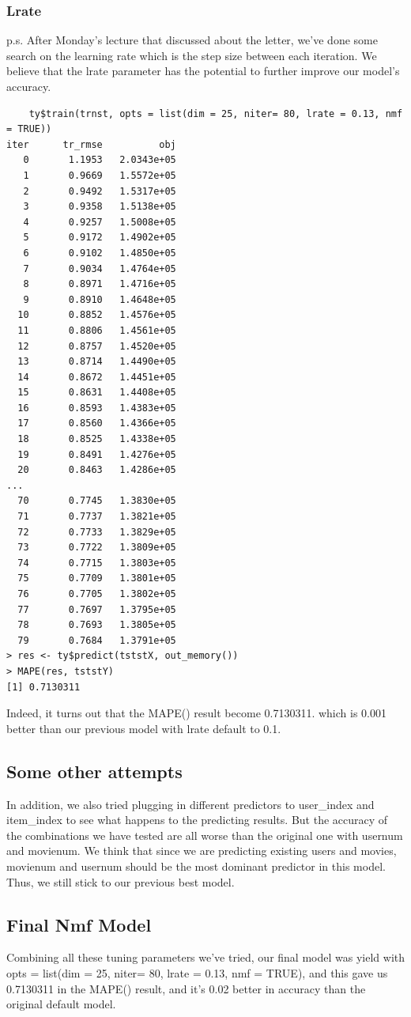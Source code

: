\documentclass[11pt]{article}
\newcommand\tab[1][0.5cm]{\hspace*{#1}}
\begin{document}
\subsubsection{Lrate}
\tab{}p.s. After Monday's lecture that discussed about the letter, we've done some search on the learning rate which is the step size between each iteration. We believe that the lrate parameter has the potential to further improve our model's accuracy.
\begin{verbatim}
    ty$train(trnst, opts = list(dim = 25, niter= 80, lrate = 0.13, nmf = TRUE))
iter      tr_rmse          obj
   0       1.1953   2.0343e+05
   1       0.9669   1.5572e+05
   2       0.9492   1.5317e+05
   3       0.9358   1.5138e+05
   4       0.9257   1.5008e+05
   5       0.9172   1.4902e+05
   6       0.9102   1.4850e+05
   7       0.9034   1.4764e+05
   8       0.8971   1.4716e+05
   9       0.8910   1.4648e+05
  10       0.8852   1.4576e+05
  11       0.8806   1.4561e+05
  12       0.8757   1.4520e+05
  13       0.8714   1.4490e+05
  14       0.8672   1.4451e+05
  15       0.8631   1.4408e+05
  16       0.8593   1.4383e+05
  17       0.8560   1.4366e+05
  18       0.8525   1.4338e+05
  19       0.8491   1.4276e+05
  20       0.8463   1.4286e+05
...
  70       0.7745   1.3830e+05
  71       0.7737   1.3821e+05
  72       0.7733   1.3829e+05
  73       0.7722   1.3809e+05
  74       0.7715   1.3803e+05
  75       0.7709   1.3801e+05
  76       0.7705   1.3802e+05
  77       0.7697   1.3795e+05
  78       0.7693   1.3805e+05
  79       0.7684   1.3791e+05
> res <- ty$predict(tststX, out_memory())
> MAPE(res, tststY)
[1] 0.7130311
\end{verbatim}
\tab{}Indeed, it turns out that the MAPE() result become 0.7130311. which is 0.001 better than our previous model with lrate default to 0.1.

\subsection{Some other attempts}
\tab{}In addition, we also tried plugging in different predictors to user\_index and item\_index to see what happens to the predicting results. But the accuracy of the combinations we have tested are all worse than the original one with usernum and movienum. We think that since we are predicting existing users and movies, movienum and usernum should be the most dominant predictor in this model. Thus, we still stick to our previous best model.

\subsection{Final Nmf Model}
\tab{}Combining all these tuning parameters we've tried, our final model was yield with opts = list(dim = 25, niter= 80, lrate = 0.13, nmf = TRUE), and this gave us 0.7130311 in the MAPE() result, and it's 0.02 better in accuracy than the original default model.
\end{document}
